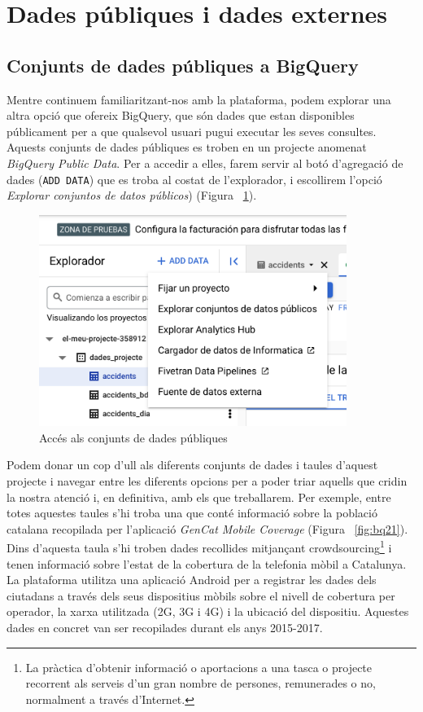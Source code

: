\documentclass[12pt,longbibliography]{article}
\theoremstyle{definition}
\theoremstyle{remark}
\begin{document}
\newpage

\section{Dades públiques i dades externes}

\subsection{Conjunts de dades públiques a BigQuery}

Mentre continuem familiaritzant-nos amb la plataforma, podem explorar una altra opció que ofereix BigQuery, que són dades que estan disponibles públicament per a que qualsevol usuari pugui executar les seves consultes. Aquests conjunts de dades públiques es troben en un projecte anomenat \textit{BigQuery Public Data}. Per a accedir a elles, farem servir al botó d'agregació de dades (\verb|ADD DATA|) que es troba al costat de l'explorador, i escollirem l'opció \textit{Explorar conjuntos de datos públicos}) (Figura ~\ref{fig:bq20}).


\begin{figure}[h!]
\begin{center}
\includegraphics[width=10cm]{bq20}
\end{center}
\caption{Accés als conjunts de dades públiques}
\label{fig:bq20}
\end{figure}


Podem donar un cop d'ull als diferents conjunts de dades i taules d'aquest projecte i navegar entre les diferents opcions per a poder triar aquells que cridin la nostra atenció i, en definitiva, amb els que treballarem. Per exemple, entre totes aquestes taules s'hi troba una que conté informació sobre la població catalana recopilada per l'aplicació \textit{GenCat Mobile Coverage} (Figura ~\ref{fig:bq21}). Dins d'aquesta taula s'hi troben dades recollides mitjançant crowdsourcing\footnote[1]{La pràctica d'obtenir informació o aportacions a una tasca o projecte recorrent als serveis d'un gran nombre de persones, remunerades o no, normalment a través d'Internet.} i tenen informació sobre l'estat de la cobertura de la telefonia mòbil a Catalunya. La plataforma utilitza una aplicació Android per a registrar les dades dels ciutadans a través dels seus dispositius mòbils sobre el nivell de cobertura per operador, la xarxa utilitzada (2G, 3G i 4G) i la ubicació del dispositiu. Aquestes dades en concret van ser recopilades durant els anys 2015-2017.
\end{document}
